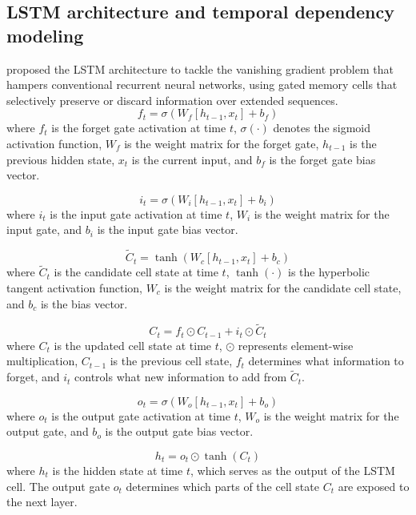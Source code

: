 \documentclass[oneside,doublespacing,flushright]{lsuthesis}
\begin{document}
\subsection{LSTM architecture and temporal dependency modeling}
\citet{Hochreiter1997} proposed the LSTM architecture to tackle the vanishing gradient problem that hampers conventional recurrent neural networks, using gated memory cells that selectively preserve or discard information over extended sequences.
\begin{equation}
f_t = \sigma(W_f [h_{t-1}, x_t] + b_f)
\end{equation}
where $f_t$ is the forget gate activation at time $t$, $\sigma(\cdot)$ denotes the sigmoid activation function, $W_f$ is the weight matrix for the forget gate, $h_{t-1}$ is the previous hidden state, $x_t$ is the current input, and $b_f$ is the forget gate bias vector.

\begin{equation}
i_t = \sigma(W_i [h_{t-1}, x_t] + b_i)
\end{equation}
where $i_t$ is the input gate activation at time $t$, $W_i$ is the weight matrix for the input gate, and $b_i$ is the input gate bias vector.

\begin{equation}
\tilde{C}_t = \tanh(W_c [h_{t-1}, x_t] + b_c)
\end{equation}
where $\tilde{C}_t$ is the candidate cell state at time $t$, $\tanh(\cdot)$ is the hyperbolic tangent activation function, $W_c$ is the weight matrix for the candidate cell state, and $b_c$ is the bias vector.

\begin{equation}
C_t = f_t \odot C_{t-1} + i_t \odot \tilde{C}_t
\end{equation}
where $C_t$ is the updated cell state at time $t$, $\odot$ represents element-wise multiplication, $C_{t-1}$ is the previous cell state, $f_t$ determines what information to forget, and $i_t$ controls what new information to add from $\tilde{C}_t$.

\begin{equation}
o_t = \sigma(W_o [h_{t-1}, x_t] + b_o)
\end{equation}
where $o_t$ is the output gate activation at time $t$, $W_o$ is the weight matrix for the output gate, and $b_o$ is the output gate bias vector.

\begin{equation}
h_t = o_t \odot \tanh(C_t)
\end{equation}
where $h_t$ is the hidden state at time $t$, which serves as the output of the LSTM cell. The output gate $o_t$ determines which parts of the cell state $C_t$ are exposed to the next layer.
\end{document}
